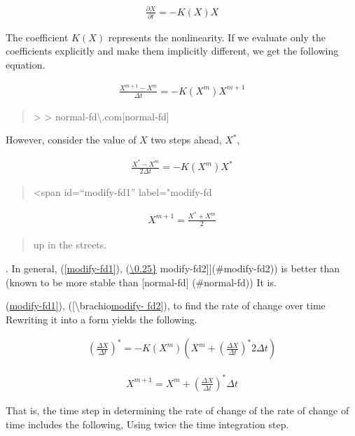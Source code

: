\begin{eqnarray}
  \frac{\partial X}{\partial t} = - K(X) X
\end{eqnarray}

The coefficient \(K(X)\) represents the nonlinearity. If we evaluate
only the coefficients explicitly and make them implicitly different, we
get the following equation.

\begin{eqnarray}
  \frac{X^{m+1} - X^m}{\Delta t} = - K( X^m ) X^{m+1}
\end{eqnarray}

\begin{quote}
\protect\hypertarget{normal-fd}{}{ \textgreater{} \textgreater{}
normal-fd\textbackslash.com{[}normal-fd{]}}
\end{quote}

However, consider the value of \(X\) two steps ahead, \(X^{\ast}\),

\begin{eqnarray}
  \frac{X^{\ast} - X^m}{2\Delta t} = - K ( X^m ) X^{\ast}
\end{eqnarray}

\begin{quote}
\textless span id=``modify-fd1'' label="modify-fd
\end{quote}

\begin{eqnarray}
  X^{m+1} = \frac{X^{\ast} + X^m}2
\end{eqnarray}

\begin{quote}
\clean up in the streets.
\end{quote}

. In general, (\protect\hyperlink{modify-fd1}{{[}modify-fd1{]}}),
(\protect\hyperlink{modify-fd1}{\textbackslash0.25\}}
modify-fd2{]}{]}(\#modify-fd2)) is better than (known to be more stable
than {[}normal-fd{]} (\#normal-fd)) It is.

(\protect\hyperlink{modify-fd1}{modify-fd1{]}}),
({[}\textbackslash brachio\protect\hyperlink{modify-fd2}{modify-
fd2{]}}), to find the rate of change over time Rewriting it into a form
yields the following.

\begin{eqnarray}
  \left(\frac{\Delta X}{\Delta t}\right)^{\ast} =
     - K( X^m ) \left( X^m +
        \left(\frac{\Delta X}{\Delta t}\right)^{\ast}
        2 \Delta t \right)
\end{eqnarray}

\begin{eqnarray}
  X^{m+1} = X^m + \left(\frac{\Delta X}{\Delta t}\right)^{\ast} \Delta t
\end{eqnarray}

That is, the time step in determining the rate of change of the rate of
change of time includes the following, Using twice the time integration
step.

